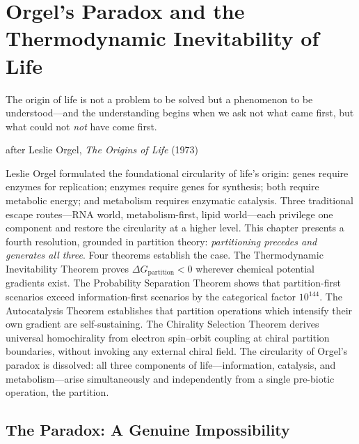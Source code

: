 
\chapter{Orgel's Paradox and the Thermodynamic Inevitability of Life}
\label{chap:orgels_paradox}

\epigraph{%
  The origin of life is not a problem to be solved but a phenomenon to be
  understood---and the understanding begins when we ask not what came first,
  but what could not \emph{not} have come first.%
}{after Leslie Orgel, \textit{The Origins of Life} (1973)}

\begin{chapterbox}
Leslie Orgel formulated the foundational circularity of life's origin: genes
require enzymes for replication; enzymes require genes for synthesis; both
require metabolic energy; and metabolism requires enzymatic catalysis. Three
traditional escape routes---RNA world, metabolism-first, lipid world---each
privilege one component and restore the circularity at a higher level. This
chapter presents a fourth resolution, grounded in partition theory:
\emph{partitioning precedes and generates all three}. Four theorems establish
the case. The Thermodynamic Inevitability Theorem proves $\Delta G_{\mathrm{partition}} < 0$
wherever chemical potential gradients exist. The Probability Separation Theorem
shows that partition-first scenarios exceed information-first scenarios by the
categorical factor $10^{144}$. The Autocatalysis Theorem establishes that
partition operations which intensify their own gradient are self-sustaining.
The Chirality Selection Theorem derives universal homochirality from electron
spin--orbit coupling at chiral partition boundaries, without invoking any
external chiral field. The circularity of Orgel's paradox is dissolved: all
three components of life---information, catalysis, and metabolism---arise
simultaneously and independently from a single pre-biotic operation, the
partition.
\end{chapterbox}

\section{The Paradox: A Genuine Impossibility}
\label{sec:orgel_paradox_statement}

